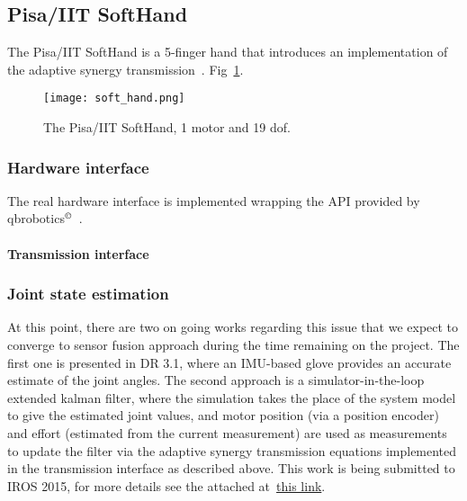 \subsection{Pisa/IIT SoftHand}
\label{sec:softhand}

The Pisa/IIT SoftHand is a 5-finger hand that introduces an implementation of the adaptive synergy transmission~\cite{Catalano2014Adaptive}. Fig~\ref{fig:soft_hand}.

\begin{figure}
\centering
\texttt{[image: soft\_hand.png]}
\caption{The Pisa/IIT SoftHand, 1 motor and 19 dof.}
\label{fig:soft_hand}
\end{figure}

\subsubsection{Hardware interface}

The real hardware interface is implemented wrapping the API provided by qbrobotics$^{\copyright}$~\cite{qbrobotics_software}.

\paragraph{Transmission interface}

\subsubsection{Joint state estimation}

At this point, there are two on going works regarding this issue that we expect to converge to sensor fusion approach during the time remaining on the project. The first one is presented in DR 3.1, where an IMU-based glove provides an accurate estimate of the joint angles. The second approach is a simulator-in-the-loop extended kalman filter, where the simulation takes the place of the system model to give the estimated joint values, and motor position (via a position encoder) and effort (estimated from the current measurement) are used as measurements to update the filter via the adaptive synergy transmission equations implemented in the transmission interface as described above. This work is being submitted to IROS 2015, for more details see the attached at~\href{}{this link}.